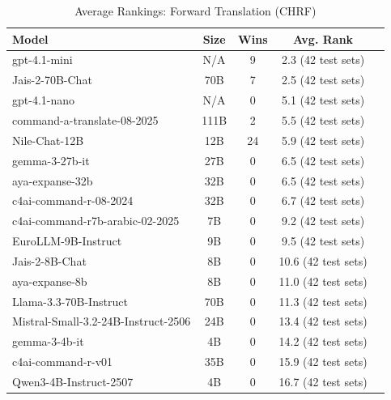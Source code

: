 \begin{table}[htbp]
\centering
\caption{Average Rankings: Forward Translation (CHRF)}
\label{tab:avg_rankings_chrf}
\begin{tabular}{l@{\hspace{3pt}}c@{\hspace{3pt}}c@{\hspace{3pt}}c@{\hspace{3pt}}c}
\toprule
Model & Size & Wins & Avg. Rank \\
\midrule
gpt-4.1-mini & N/A & 9 & 2.3 (42 test sets) \\
Jais-2-70B-Chat & 70B & 7 & 2.5 (42 test sets) \\
gpt-4.1-nano & N/A & 0 & 5.1 (42 test sets) \\
command-a-translate-08-2025 & 111B & 2 & 5.5 (42 test sets) \\
Nile-Chat-12B & 12B & 24 & 5.9 (42 test sets) \\
gemma-3-27b-it & 27B & 0 & 6.5 (42 test sets) \\
aya-expanse-32b & 32B & 0 & 6.5 (42 test sets) \\
c4ai-command-r-08-2024 & 32B & 0 & 6.7 (42 test sets) \\
c4ai-command-r7b-arabic-02-2025 & 7B & 0 & 9.2 (42 test sets) \\
EuroLLM-9B-Instruct & 9B & 0 & 9.5 (42 test sets) \\
Jais-2-8B-Chat & 8B & 0 & 10.6 (42 test sets) \\
aya-expanse-8b & 8B & 0 & 11.0 (42 test sets) \\
Llama-3.3-70B-Instruct & 70B & 0 & 11.3 (42 test sets) \\
Mistral-Small-3.2-24B-Instruct-2506 & 24B & 0 & 13.4 (42 test sets) \\
gemma-3-4b-it & 4B & 0 & 14.2 (42 test sets) \\
c4ai-command-r-v01 & 35B & 0 & 15.9 (42 test sets) \\
Qwen3-4B-Instruct-2507 & 4B & 0 & 16.7 (42 test sets) \\
\bottomrule
\end{tabular}
\end{table}